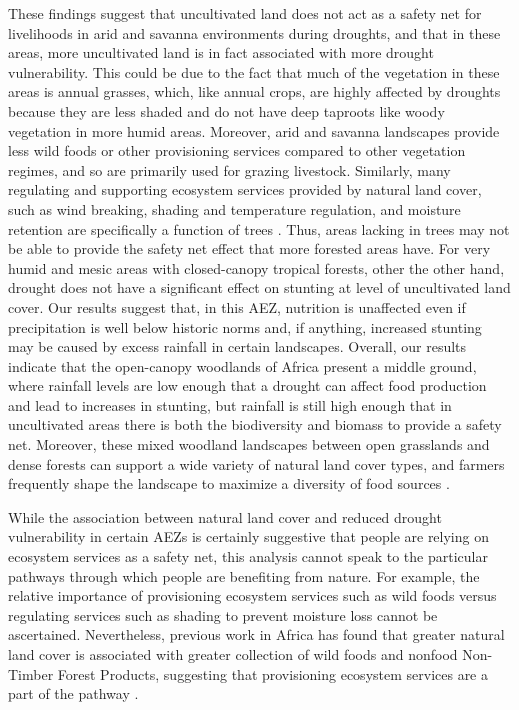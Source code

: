 \documentclass{article}
\begin{document}
These findings suggest that uncultivated land does not act as a safety net for livelihoods in arid and savanna environments during droughts, and that in these areas, more uncultivated land is in fact associated with more drought vulnerability.  This could be due to the fact that much of the vegetation in these areas is annual grasses, which, like annual crops, are highly affected by droughts because they are less shaded and do not have deep taproots like woody vegetation in more humid areas.  Moreover, arid and savanna landscapes provide less wild foods or other provisioning services compared to other vegetation regimes, and so are primarily used for grazing livestock.  Similarly, many regulating and supporting ecosystem services provided by natural land cover, such as wind breaking, shading and temperature regulation, and moisture retention are specifically a function of trees \cite{Reed2016}.  Thus, areas lacking in trees may not be able to provide the safety net effect that more forested areas have.  For very humid and mesic areas with closed-canopy tropical forests, other the other hand, drought does not have a significant effect on stunting at level of uncultivated land cover.  Our results suggest that, in this AEZ, nutrition is unaffected even if precipitation is well below historic norms and, if anything, increased stunting may be caused by excess rainfall in certain landscapes.  Overall, our results indicate that the open-canopy woodlands of Africa present a middle ground, where rainfall levels are low enough that a drought can affect food production and lead to increases in stunting, but rainfall is still high enough that in uncultivated areas there is both the biodiversity and biomass to provide a safety net.  Moreover, these mixed woodland landscapes between open grasslands and dense forests can support a wide variety of natural land cover types, and farmers frequently shape the landscape to maximize a diversity of food sources \cite{fairhead1996misreading}.

While the association between natural land cover and reduced drought vulnerability in certain AEZs is certainly suggestive that people are relying on ecosystem services as a safety net, this analysis cannot speak to the particular pathways through which people are benefiting from nature.  For example, the relative importance of provisioning ecosystem services such as wild foods versus regulating services such as shading to prevent moisture loss cannot be ascertained.  Nevertheless, previous work in Africa has found that greater natural land cover is associated with greater collection of wild foods and nonfood Non-Timber Forest Products, suggesting that provisioning ecosystem services are a part of the pathway \cite{Cooper2018a}.
\end{document}
